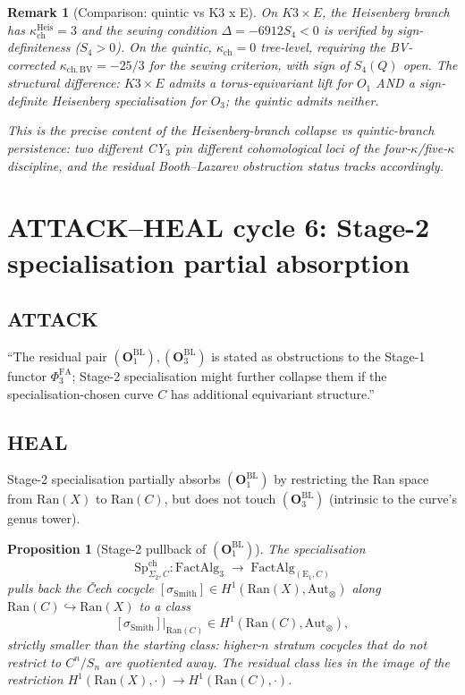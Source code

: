 \documentclass[11pt]{amsart}
\newtheorem{proposition}[theorem]{Proposition}
\newtheorem{remark}[theorem]{Remark}
\newcommand{\kch}{\kappa_{\mathrm{ch}}}
\newcommand{\kchBV}{\kappa_{\mathrm{ch},\mathrm{BV}}}
\newcommand{\Ran}{\mathrm{Ran}}
\newcommand{\Aut}{\mathrm{Aut}}
\newcommand{\PhiFA}{\Phi^{\mathrm{FA}}}
\begin{document}
\begin{remark}[Comparison: quintic vs K3 x E]
On $K3 \times E$, the Heisenberg branch has
$\kch^{\mathrm{Heis}} = 3$ and the sewing condition
$\Delta = -6912 S_4 < 0$ is verified by sign-definiteness
($S_4 > 0$). On the quintic, $\kch = 0$ tree-level, requiring the
BV-corrected $\kchBV = -25/3$ for the sewing criterion, with
sign of $S_4(Q)$ open. The structural difference:
$K3 \times E$ admits a torus-equivariant lift for $O_1$ AND a
sign-definite Heisenberg specialisation for $O_3$; the quintic
admits neither.

This is the precise content of the Heisenberg-branch collapse vs
quintic-branch persistence: two different CY$_3$ pin different
cohomological loci of the four-$\kappa$/five-$\kappa$ discipline,
and the residual Booth--Lazarev obstruction status tracks
accordingly.
\end{remark}

\section{ATTACK--HEAL cycle 6: Stage-2 specialisation partial
absorption}
\label{sec:cycle-6-stage-two-absorb}

\subsection*{ATTACK}

``The residual pair $(\mathbf{O}_1^{\mathrm{BL}}),
(\mathbf{O}_3^{\mathrm{BL}})$ is stated as obstructions to the
Stage-1 functor $\PhiFA_3$; Stage-2 specialisation might further
collapse them if the specialisation-chosen curve $C$ has
additional equivariant structure.''

\subsection*{HEAL}

Stage-2 specialisation partially absorbs $(\mathbf{O}_1^{\mathrm{BL}})$
by restricting the Ran space from $\Ran(X)$ to $\Ran(C)$, but does
not touch $(\mathbf{O}_3^{\mathrm{BL}})$ (intrinsic to the curve's
genus tower).

\begin{proposition}[Stage-2 pullback of
$(\mathbf{O}_1^{\mathrm{BL}})$]
\label{prop:stage-two-absorb-O1}
The specialisation
\[
\mathrm{Sp}^{\mathrm{ch}}_{\Sigma_2, C} : \mathrm{FactAlg}_3
\;\to\; \mathrm{FactAlg}_{(\mathrm{E}_1, C)}
\]
pulls back the \v{C}ech cocycle $[\sigma_{\mathrm{Smith}}] \in
H^1(\Ran(X), \Aut_\otimes)$ along $\Ran(C) \hookrightarrow \Ran(X)$
to a class
\[
[\sigma_{\mathrm{Smith}}]|_{\Ran(C)} \in H^1(\Ran(C), \Aut_\otimes),
\]
strictly smaller than the starting class: higher-$n$ stratum
cocycles that do not restrict to $C^n/S_n$ are quotiented away.
The residual class lies in the image of the restriction
$H^1(\Ran(X), \cdot) \to H^1(\Ran(C), \cdot)$.
\end{proposition}
\end{document}
